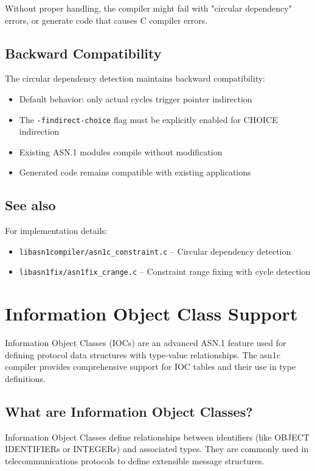 \documentclass[english,oneside,12pt]{book}
\begin{document}
Without proper handling, the compiler might fail with "circular dependency" errors, or 
generate code that causes C compiler errors.

\subsection*{Backward Compatibility}

The circular dependency detection maintains backward compatibility:
\begin{itemize}
\item Default behavior: only actual cycles trigger pointer indirection
\item The \texttt{-findirect-choice} flag must be explicitly enabled for CHOICE indirection
\item Existing ASN.1 modules compile without modification
\item Generated code remains compatible with existing applications
\end{itemize}

\subsection*{See also}

For implementation details:
\begin{itemize}
\item \texttt{libasn1compiler/asn1c\_constraint.c} -- Circular dependency detection
\item \texttt{libasn1fix/asn1fix\_crange.c} -- Constraint range fixing with cycle detection
\end{itemize}

\section{\label{sec:IOC-Support}Information Object Class Support}

Information Object Classes (IOCs) are an advanced ASN.1 feature used for defining 
protocol data structures with type-value relationships. The asn1c compiler provides 
comprehensive support for IOC tables and their use in type definitions.

\subsection*{What are Information Object Classes?}

Information Object Classes define relationships between identifiers (like OBJECT IDENTIFIERs 
or INTEGERs) and associated types. They are commonly used in telecommunications protocols 
to define extensible message structures.
\end{document}
